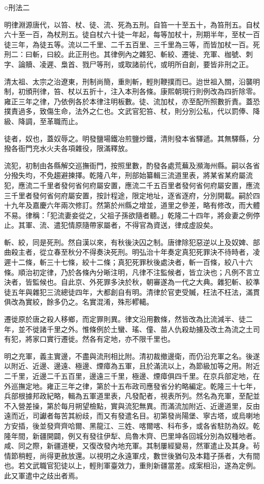 
\begin{pinyinscope}
○刑法二

明律淵源唐代，以笞、杖、徒、流、死為五刑。自笞一十至五十，為笞刑五。自杖六十至一百，為杖刑五。徒自杖六十徒一年起，每等加杖十，刑期半年，至杖一百徒三年，為徒五等。流以二千里、二千五百里、三千里為三等，而皆加杖一百。死刑二：曰斬，曰絞。此正刑也。其律例內之雜犯、斬絞、遷徙、充軍、枷號、刺字、論贖、凌遲、梟首、戮尸等刑，或取諸前代，或明所自創，要皆非刑之正。

清太祖、太宗之治遼東，刑制尚簡，重則斬，輕則鞭撲而已。迨世祖入關，沿襲明制，初頒刑律，笞、杖以五折十，注入本刑各條。康熙朝現行則例改為四折除零。雍正三年之律，乃依例各於本律注明板數。徒、流加杖，亦至配所照數折責。蓋恐撲責過多，致傷生命，法外之仁也。文武官犯笞、杖，則分別公私，代以罰俸、降級、降調，至革職而止。

徒者，奴也，蓋奴辱之。明發鹽場鐵冶煎鹽炒鐵，清則發本省驛遞。其無驛縣，分撥各衙門充水火夫各項雜役，限滿釋放。

流犯，初制由各縣解交巡撫衙門，按照里數，酌發各處荒蕪及瀕海州縣。嗣以各省分撥失均，不免趨避揀擇。乾隆八年，刑部始纂輯三流道里表，將某省某府屬流犯，應流二千里者發何省何府屬安置，應流二千五百里者發何省何府屬安置，應流三千里者發何省何府屬安置，按計程途，限定地址，逐省逐府，分別開載。嗣於四十九年及嘉慶六年兩次修訂。然第於州縣之增並，道里之參差，略有修改，而大體不易。律稱：「犯流妻妾從之，父祖子孫欲隨者聽。」乾隆二十四年，將僉妻之例停止。其軍、流、遣犯情原隨帶家屬者，不得官為資送，律成虛設矣。

斬、絞，同是死刑。然自漢以來，有秋後決囚之制。唐律除犯惡逆以上及奴婢、部曲殺主者，從立春至秋分不得奏決死刑。明弘治十年奏定真犯死罪決不待時者，凌遲十二條，斬三十七條，絞十二條；真犯死罪秋後處決者，斬一百條，絞八十六條。順治初定律，乃於各條內分晰注明，凡律不注監候者，皆立決也；凡例不言立決者，皆監候也。自此京、外死罪多決於秋，朝審遂為一代之大典。雜犯斬、絞準徒五年與雜犯三流總徒四年，大都創自有明。清律於官吏受贓，枉法不枉法，滿貫俱改為實絞，餘多仍之。名實混淆，殊形轇轕。

遷徙原於唐之殺人移鄉，而定罪則異。律文沿用數條，然皆改為比流減半、徒二年，並不徙諸千里之外。惟條例於土蠻、瑤、僮、苗人仇殺劫擄及改土為流之土司有犯，將家口實行遷徙。然各有定地，亦不限千里也。

明之充軍，義主實邊，不盡與流刑相比附。清初裁撤邊衛，而仍沿充軍之名。後遂以附近、近邊、邊遠、極邊、煙瘴為五軍，且於滿流以上，為節級加等之用。附近二千里，近邊二千五百里，邊遠三千里，極邊、煙瘴俱四千里。在京兵部定地，在外巡撫定地。雍正三年之律，第於十五布政司應發省分約略編定。乾隆三十七年，兵部根據邦政紀略，輯為五軍道里表，凡發配者，視表所列。然名為充軍，至配並不入營差操，第於每月朔望檢點，實與流犯無異。而滿流加附近、近邊道里，反由遠而近，司讞者每苦其紛歧，而又有發遣名目。初第發尚陽堡、寧古塔，或烏喇地方安插，後並發齊齊哈爾、黑龍江、三姓、喀爾喀、科布多，或各省駐防為奴。乾隆年間，新疆開闢，例又有發往伊犁、烏魯木齊、巴里坤各回城分別為奴種地者。咸、同之際，新疆道梗，又復改發內地充軍。其制屢經變易，然軍遣止及其身。茍情節稍輕，尚得更赦放還。以視明之永遠軍戍，數世後猶句及本籍子孫者，大有間也。若文武職官犯徒以上，輕則軍臺效力，重則新疆當差。成案相沿，遂為定例。此又軍遣中之歧出者焉。


\end{pinyinscope}
